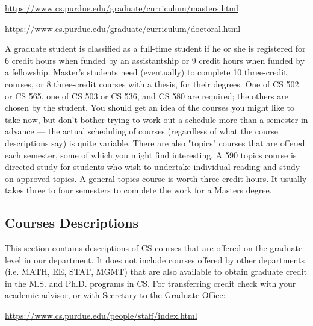 \centerline{\url{https://www.cs.purdue.edu/graduate/curriculum/masters.html}}
\vspace{\baselineskip}

\centerline{\url{https://www.cs.purdue.edu/graduate/curriculum/doctoral.html}}
\vspace{\baselineskip}

A graduate student is classified as a full-time student if he or she is registered for 6 credit hours when funded by an assistantship or 9 credit hours when funded by a fellowship. Master's students need (eventually) to complete 10 three-credit courses, or 8 three-credit courses with a thesis, for their degrees. One of CS 502 or CS 565, one of CS 503 or CS 536, and CS 580 are required; the others are chosen by the student. You should get an idea of the courses you might like to take now, but don't bother trying to work out a schedule more than a semester in advance --- the actual scheduling of courses (regardless of what the course descriptions say) is quite variable. There are also "topics" courses that are offered each semester, some of which you might find interesting. A 590 topics course is directed study for students who wish to undertake individual reading and study on approved topics. A general topics course is worth three credit hours. It usually takes three to four semesters to complete the work for a Masters degree.



\subsection{Courses Descriptions}

This section contains descriptions of CS courses that are offered on the graduate level in our department. It does not include courses offered by other departments (i.e. MATH, EE, STAT, MGMT) that are also available to obtain graduate credit in the M.S. and Ph.D. programs in CS. For transferring credit check with your academic advisor, or with Secretary to the Graduate Office:

\centerline{\url{https://www.cs.purdue.edu/people/staff/index.html}}
\vspace{\baselineskip}

